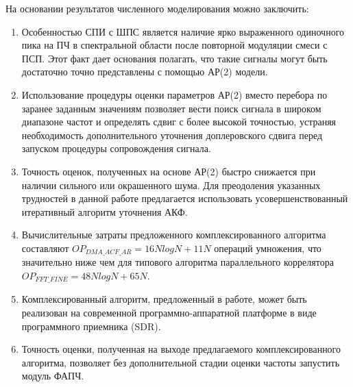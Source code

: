 На основании результатов численного моделирования можно заключить:
\begin{enumerate}
\item Особенностью СПИ с ШПС является наличие ярко выраженного одиночного пика на ПЧ в спектральной области после повторной модуляции смеси с ПСП.
	Этот факт дает основания полагать, что такие сигналы могут быть достаточно точно представлены с помощью АР(2) модели.
\item Использование процедуры оценки параметров АР(2) вместо перебора по заранее заданным значениям позволяет вести поиск сигнала в широком диапазоне частот и определять сдвиг
	с более высокой точностью, устраняя необходимость дополнительного уточнения доплеровского сдвига перед запуском процедуры сопровождения сигнала.
\item Точность оценок, полученных на основе АР(2) быстро снижается при наличии сильного или окрашенного шума. Для преодоления указанных трудностей в 
	данной работе предлагается использовать усовершенствованный итеративный алгоритм уточнения АКФ.
\item Вычислительные затраты предложенного комплексированного алгоритма составляют ${OP_{DMA\_ACF\_AR} = 16NlogN + 11N}$  операций умножения, что значительно ниже чем  для
	типового алгоритма параллельного коррелятора ${OP_{FFT\_FINE} = 48NlogN + 65N}$.
\item Комплексированный алгоритм, предложенный в работе, может быть реализован на современной программно-аппаратной платформе в виде программного приемника (SDR). 
\item Точность оценки, полученная на выходе предлагаемого комплексированного алгоритма, позволяет без дополнительной стадии оценки частоты запустить модуль ФАПЧ.
\end{enumerate}

\clearpage
